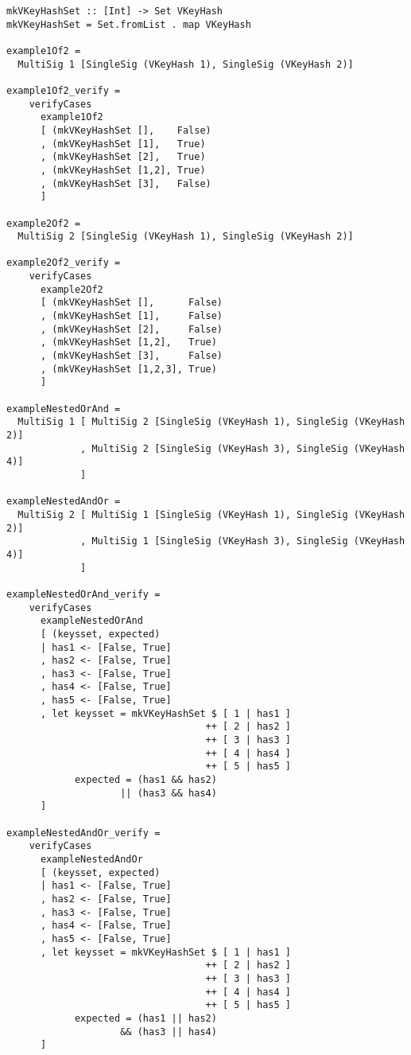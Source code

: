 \documentclass[11pt,a4paper,dvipsnames]{article}
\theoremstyle{definition}
\begin{document}
\begin{verbatim}
mkVKeyHashSet :: [Int] -> Set VKeyHash
mkVKeyHashSet = Set.fromList . map VKeyHash

example1Of2 =
  MultiSig 1 [SingleSig (VKeyHash 1), SingleSig (VKeyHash 2)]

example1Of2_verify =
    verifyCases
      example1Of2
      [ (mkVKeyHashSet [],    False)
      , (mkVKeyHashSet [1],   True)
      , (mkVKeyHashSet [2],   True)
      , (mkVKeyHashSet [1,2], True)
      , (mkVKeyHashSet [3],   False)
      ]

example2Of2 =
  MultiSig 2 [SingleSig (VKeyHash 1), SingleSig (VKeyHash 2)]

example2Of2_verify =
    verifyCases
      example2Of2
      [ (mkVKeyHashSet [],      False)
      , (mkVKeyHashSet [1],     False)
      , (mkVKeyHashSet [2],     False)
      , (mkVKeyHashSet [1,2],   True)
      , (mkVKeyHashSet [3],     False)
      , (mkVKeyHashSet [1,2,3], True)
      ]

exampleNestedOrAnd =
  MultiSig 1 [ MultiSig 2 [SingleSig (VKeyHash 1), SingleSig (VKeyHash 2)]
             , MultiSig 2 [SingleSig (VKeyHash 3), SingleSig (VKeyHash 4)]
             ]

exampleNestedAndOr =
  MultiSig 2 [ MultiSig 1 [SingleSig (VKeyHash 1), SingleSig (VKeyHash 2)]
             , MultiSig 1 [SingleSig (VKeyHash 3), SingleSig (VKeyHash 4)]
             ]

exampleNestedOrAnd_verify =
    verifyCases
      exampleNestedOrAnd
      [ (keysset, expected)
      | has1 <- [False, True]
      , has2 <- [False, True]
      , has3 <- [False, True]
      , has4 <- [False, True]
      , has5 <- [False, True]
      , let keysset = mkVKeyHashSet $ [ 1 | has1 ]
                                   ++ [ 2 | has2 ]
                                   ++ [ 3 | has3 ]
                                   ++ [ 4 | has4 ]
                                   ++ [ 5 | has5 ]
            expected = (has1 && has2)
                    || (has3 && has4)
      ]

exampleNestedAndOr_verify =
    verifyCases
      exampleNestedAndOr
      [ (keysset, expected)
      | has1 <- [False, True]
      , has2 <- [False, True]
      , has3 <- [False, True]
      , has4 <- [False, True]
      , has5 <- [False, True]
      , let keysset = mkVKeyHashSet $ [ 1 | has1 ]
                                   ++ [ 2 | has2 ]
                                   ++ [ 3 | has3 ]
                                   ++ [ 4 | has4 ]
                                   ++ [ 5 | has5 ]
            expected = (has1 || has2)
                    && (has3 || has4)
      ]
\end{verbatim}
\end{document}
